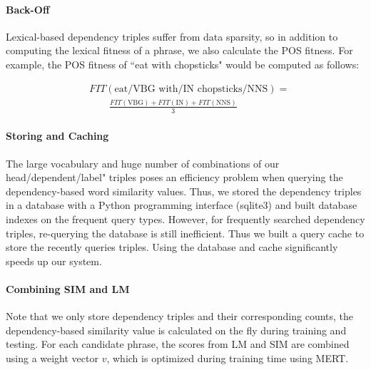 \documentclass[11pt]{article}
\begin{document}
\paragraph{Back-Off}
Lexical-based dependency triples suffer from data sparsity, so in addition to computing the lexical fitness of a phrase, we also calculate the POS fitness. For example, the POS fitness of ``eat with chopsticks" would be computed as follows:

\begin{align}
& FIT(\mbox{eat/VBG with/IN chopsticks/NNS}) = \nonumber \\
 & \qquad \frac{FIT(\mbox{VBG}) + FIT(\mbox{IN}) + FIT(\mbox{NNS})}{3} 
\end{align}



\paragraph{Storing and Caching}
The large vocabulary and huge number of combinations of  our head/dependent/label" triples poses an efficiency problem when querying the dependency-based word similarity values. Thus, we stored the dependency triples in a database with a Python programming interface (sqlite3) and built database indexes on the frequent query types. However, for frequently searched dependency triples, re-querying the database is still inefficient. Thus we built a query cache to store the recently queries triples. Using the database and cache significantly speeds up our system. 


\paragraph{Combining SIM and LM}
Note that we only store dependency triples and their corresponding counts, the dependency-based similarity value is calculated on the fly during training and testing. For each candidate phrase, the scores from LM and SIM are combined using a weight vector $v$, which is optimized during training time using MERT. 
\end{document}
